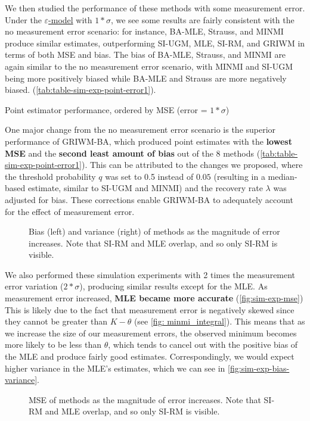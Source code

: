 We then studied the performance of these methods with some measurement error. Under the  \hyperref[model: measurement-error]{$\varepsilon$-model} with $1*\sigma$, we see some results are fairly consistent with the no measurement error scenario: for instance, BA-MLE, Strauss, and MINMI produce similar estimates, outperforming SI-UGM, MLE, SI-RM, and GRIWM in terms of both MSE and bias. The bias of BA-MLE, Strauss, and MINMI are again similar to the no measurement error scenario, with MINMI and SI-UGM being more positively biased while BA-MLE and Strauss are more negatively biased. (\autoref{tab:table-sim-exp-point-error1}).
\begin{table}[ht]
    \centering
    \caption{Point estimator performance, ordered by MSE (error = $1*\sigma$)}
    
    \label{tab:table-sim-exp-point-error1}
\end{table}

One major change from the no measurement error scenario is the superior performance of GRIWM-BA, which produced point estimates with the \textbf{lowest MSE} and the \textbf{second least amount of bias} out of the 8 methods (\autoref{tab:table-sim-exp-point-error1}). This can be attributed to the changes we proposed, where the threshold probability $q$ was set to 0.5 instead of $0.05$ (resulting in a median-based estimate, similar to SI-UGM and MINMI) and the recovery rate $\lambda$ was adjusted for bias. These corrections enable GRIWM-BA to adequately account for the effect of measurement error.
\begin{figure}[ht]
    \centering
    
    \caption{Bias (left) and variance (right) of methods as the magnitude of error increases. Note that SI-RM and MLE overlap, and so only SI-RM is visible.}
    \label{fig:sim-exp-bias-variance}
\end{figure}

We also performed these simulation experiments with 2 times the measurement error variation ($2*\sigma$), producing similar results except for the MLE. As measurement error increased, \textbf{MLE became more accurate} (\autoref{fig:sim-exp-mse}) This is likely due to the fact that measurement error is negatively skewed since they cannot be greater than $K-\theta$ (see \autoref{fig: minmi_integral}). This means that as we increase the size of our measurement errors, the observed minimum becomes more likely to be less than $\theta$, which tends to cancel out with the positive bias of the MLE and produce fairly good estimates. Correspondingly, we would expect higher variance in the MLE's estimates, which we can see in \autoref{fig:sim-exp-bias-variance}.
\begin{figure}[ht]
    \centering
    
    \caption{MSE of methods as the magnitude of error increases. Note that SI-RM and MLE overlap, and so only SI-RM is visible.}
    \label{fig:sim-exp-mse}
\end{figure}

